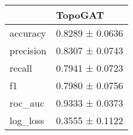 \begin{tabular}{ll}
\toprule
 & TopoGAT \\
\midrule
accuracy & 0.8289 ± 0.0636 \\
precision & 0.8307 ± 0.0743 \\
recall & 0.7941 ± 0.0723 \\
f1 & 0.7980 ± 0.0756 \\
roc_auc & 0.9333 ± 0.0373 \\
log_loss & 0.3555 ± 0.1122 \\
\bottomrule
\end{tabular}
